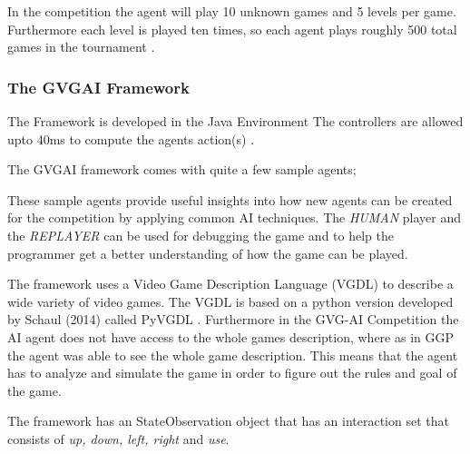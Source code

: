 \documentclass[journal]{IEEEtran}
\begin{document}
		In the competition the agent will play 10 unknown games and 5 levels per game. Furthermore each level is played ten times, so each agent plays roughly 500 total games in the tournament \cite{schuster2015mcts}.
		
	
	
	\subsubsection{The GVGAI Framework}
		The Framework is developed in the Java Environment 
		The controllers are allowed upto 40ms to compute the agents action(s) \cite{perez2016GVGAICompetition, GVGAI}.
		
		The GVGAI framework comes with quite a few sample agents;
		

		These sample agents provide useful insights into how new agents can be created for the competition by applying common AI techniques.
		The \textit{HUMAN} player and the \textit{REPLAYER} can be used for debugging the game and to help the programmer get a better understanding of how the game can be played.
		
		
		The framework uses a Video Game Description Language (VGDL) to describe a wide variety of video games. The VGDL is based on a python version developed by Schaul (2014) called PyVGDL \cite{schuster2015mcts}. Furthermore in the GVG-AI Competition the AI agent does not have access to the whole games description, where as in GGP the agent was able to see the whole game description. This means that the agent has to analyze and simulate the game in order to figure out the rules and goal of the game.
		
		
		The framework has an StateObservation object that has an interaction set that consists of \textit{up, down, left, right} and \textit{use}.
\end{document}
